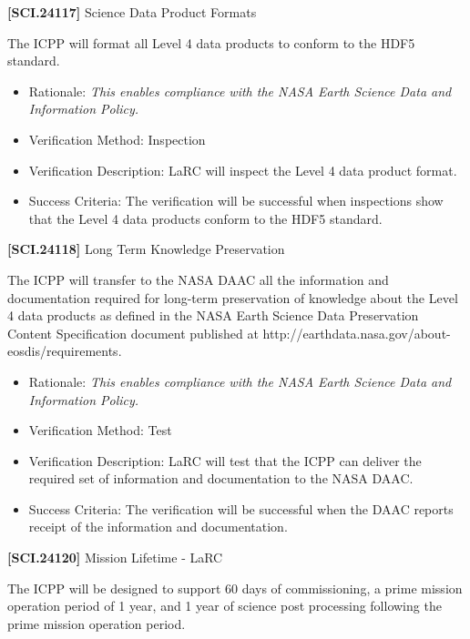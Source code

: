 \textbf{[SCI.24117]} Science Data Product Formats

The \gls{ICPP} will format all Level 4 data products to conform to the HDF5 standard.

\begin{itemize}
\item{} Rationale: \emph{This enables compliance with the NASA Earth Science Data and Information Policy.}

\item{} Verification Method: Inspection

\item{} Verification Description: \gls{LaRC} will inspect the Level 4 data product format.

\item{} Success Criteria: The verification will be successful when \gls{inspection}s show that the Level 4 data products conform to the HDF5 standard.

\end{itemize}

\textbf{[SCI.24118]} Long Term Knowledge Preservation

The \gls{ICPP} will transfer to the NASA \gls{DAAC} all the information and documentation required for long-term preservation of knowledge about the Level 4 data products as defined in the NASA Earth Science Data Preservation Content Specification document published at http:\slash \slash earthdata.nasa.gov\slash about-eosdis\slash requirements.

\begin{itemize}
\item{} Rationale: \emph{This enables compliance with the NASA Earth Science Data and Information Policy.}

\item{} Verification Method: Test

\item{} Verification Description: \gls{LaRC} will \gls{test} that the \gls{ICPP} can deliver the required set of information and documentation to the NASA \gls{DAAC}.

\item{} Success Criteria: The verification will be successful when the \gls{DAAC} reports receipt of the information and documentation.

\end{itemize}

\textbf{[SCI.24120]} Mission Lifetime - \gls{LaRC}

The \gls{ICPP} will be designed to support 60 days of commissioning, a prime mission operation period of 1 year, and 1 year of science post processing following the prime mission operation period.

